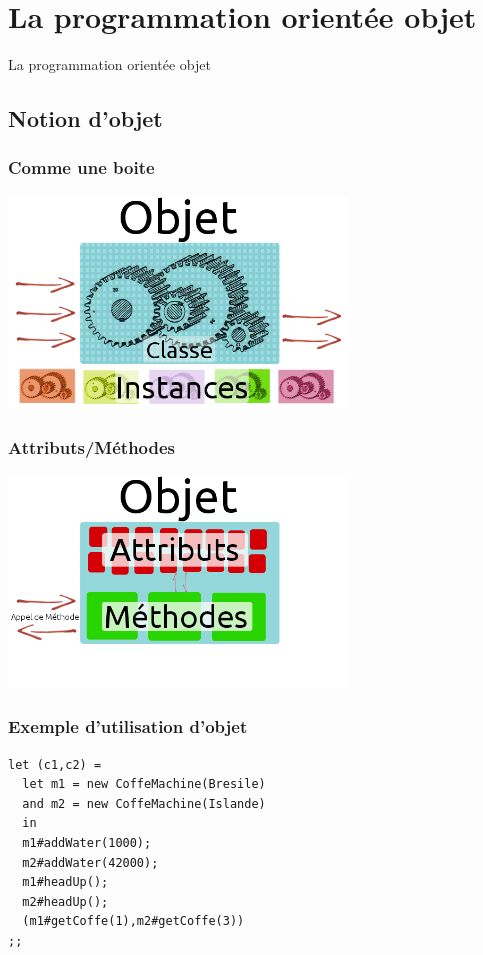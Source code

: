 \section{La programmation orientée objet}
\begin{frame}
	\begin{center}
	\huge
	La programmation orientée objet
	\end{center}
\end{frame}

\subsection{Notion d'objet} %
\begin{frame}
	\frametitle{Comme une boite}
	\begin{center}
	\includegraphics[width=9cm]{pics/explObj1.png}
	\end{center}
\end{frame}
\begin{frame}
	\frametitle{Attributs/Méthodes}
	\begin{center}
	\includegraphics[width=9cm]{pics/explObj2.png}
	\end{center}
\end{frame}
\begin{frame}[fragile]
	\frametitle{Exemple d'utilisation d'objet}
	\begin{lstlisting}
let (c1,c2) =
  let m1 = new CoffeMachine(Bresile)
  and m2 = new CoffeMachine(Islande)
  in
  m1#addWater(1000);
  m2#addWater(42000);
  m1#headUp();
  m2#headUp();
  (m1#getCoffe(1),m2#getCoffe(3))
;;
	\end{lstlisting}
\end{frame}

